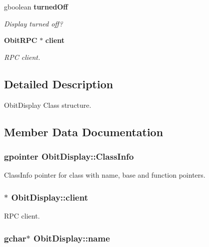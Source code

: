 \begin{CompactItemize}
gboolean {\bf turned\-Off}
\begin{CompactList}\small\item\em Display turned off? \item\end{CompactList}\item 
{\bf Obit\-RPC} $\ast$ {\bf client}
\begin{CompactList}\small\item\em RPC client. \item\end{CompactList}\end{CompactItemize}


\subsection{Detailed Description}
Obit\-Display Class structure. 



\subsection{Member Data Documentation}
\subsubsection{\setlength{\rightskip}{0pt plus 5cm}gpointer {\bf Obit\-Display::Class\-Info}}\label{structObitDisplay_o1}


Class\-Info pointer for class with name, base and function pointers. 

\subsubsection{$\ast$ {\bf Obit\-Display::client}}\label{structObitDisplay_o7}


RPC client. 

\subsubsection{\setlength{\rightskip}{0pt plus 5cm}gchar$\ast$ {\bf Obit\-Display::name}}\label{structObitDisplay_o3}


